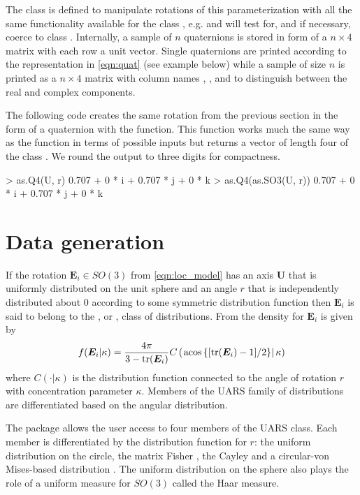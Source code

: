 The  class  is defined to manipulate rotations of this parameterization with all the same functionality available for the class , e.g.  and  will test for, and if necessary, coerce to  class .  Internally, a sample of $n$ quaternions is stored  in form of  a $n\times4$ matrix with each row a unit vector. Single quaternions are printed according to the representation in \eqref{eqn:quat} (see example below) while a sample of size $n$ is printed as a $n\times 4$ matrix with column names , ,  and  to distinguish between the real and complex components.

The following code creates the same rotation from the previous section in the form of a quaternion with the  function.  This function works much the same way as the  function in terms of possible inputs but returns a vector of length four of the class .   We round the output to three digits for compactness.

\begin{example}
> as.Q4(U, r)
0.707 + 0 * i + 0.707 * j + 0 * k
> as.Q4(as.SO3(U, r))
0.707 + 0 * i + 0.707 * j + 0 * k
\end{example}

\section{Data generation\label{section:generation}} 

If the rotation $\bm{E}_i\in SO(3)$ from \eqref{eqn:loc_model} has an axis $\bm U$ that is uniformly distributed on the unit sphere and an angle $r$ that is independently distributed about $0$ according to some symmetric distribution function then $\bm E_i$ is said to belong to the , or , class of distributions.   From \cite{bingham2009} the density for $\bm E_i$ is given by
\begin{equation*}%
f(\bm E_i|\kappa)=\frac{4\pi}{3-\tr(\bm E_i)}C\left(\left.\text{acos}\left\{[\tr(\bm E_i)-1]/2\right\}\right|\kappa\right)
\end{equation*}
where $C(\cdot|\kappa)$ is the distribution function connected to the angle of rotation $r$ with concentration parameter $\kappa$.  Members of the UARS family of distributions are differentiated based on the angular distribution.

The  package allows the user access to four members of the UARS class.  Each member is differentiated by the distribution function for $r$: the uniform distribution on the circle, the matrix Fisher \citep{langevin2005, downs1972, khatri1977, jupp1979}, the Cayley  \citep{Schaeben1997, leon2006} and a circular-von Mises-based distribution \citep{bingham2009}.  The uniform distribution on the sphere also plays the role of a uniform measure for $SO(3)$ called the Haar measure.  

